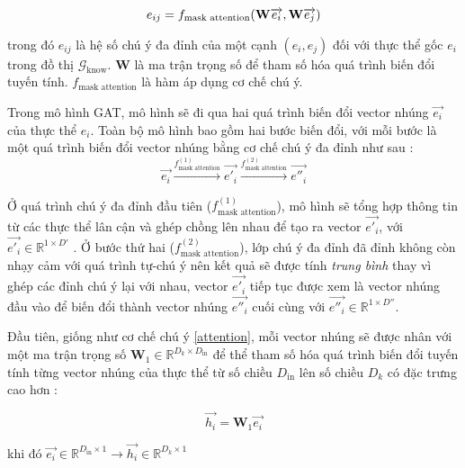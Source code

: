 \begin{equation}
	\label{maskAttention}
	\centering
	{e_{ij}}={f_{\text{mask attention}}(\mathbf{W} \overrightarrow{e_i}, \mathbf{W} \overrightarrow{e_j})}
\end{equation}

trong đó $e_{ij}$ là hệ số chú ý đa đỉnh của một cạnh $(e_i, e_j)$ đối với thực thể gốc $e_i$ trong đồ thị $\mathcal{G}_{\text{know}}$. $\mathbf{W}$ là ma trận trọng số để tham số hóa quá trình biến đổi tuyến tính. $f_{\text{mask attention}}$ là hàm áp dụng cơ chế chú ý.

Trong mô hình GAT, mô hình sẽ đi qua hai quá trình biến đổi vector nhúng $\overrightarrow{e_i}$ của thực thể $e_i$. Toàn bộ mô hình bao gồm hai bước biến đổi, với mỗi bước là một quá trình biến đổi vector nhúng bằng cơ chế chú ý đa đỉnh như sau :
\begin{equation}
	\label{gatProcess}
	\overrightarrow{e_i} \xrightarrow{f_{\text{mask attention}}^{(1)}} \overrightarrow{e'_i} \xrightarrow{f_{\text{mask attention}}^{(2)}} \overrightarrow{e''_i}
\end{equation}

Ở quá trình chú ý đa đỉnh đầu tiên ($f_{\text{mask attention}}^{(1)}$), mô hình sẽ tổng hợp thông tin từ các thực thể lân cận và ghép chồng lên nhau để tạo ra vector $\overrightarrow{e'_i}$, với $\overrightarrow{e'_i} \in \mathbb{R}^{1 \times D'}$ . Ở bước thứ hai ($f_{\text{mask attention}}^{(2)}$), lớp chú ý đa đỉnh đã đỉnh không còn nhạy cảm với quá trình tự-chú ý nên kết quả sẽ được tính \textit{trung bình} thay vì ghép các đỉnh chú ý lại với nhau, vector $\overrightarrow{e'_i}$ tiếp tục được xem là vector nhúng đầu vào để biến đổi thành vector nhúng $\overrightarrow{e''_i}$ cuối cùng với $\overrightarrow{e''_i} \in \mathbb{R}^{1 \times D''}$.

Đầu tiên, giống như cơ chế chú ý \ref{attention}, mỗi vector nhúng sẽ được nhân với một ma trận trọng số $\mathbf{W}_1 \in \mathbb{R}^{D_k \times D_{\text{in}}}$ để thể tham số hóa quá trình biến đổi tuyến tính từng vector nhúng của thực thể từ số chiều $D_{\text{in}}$ lên số chiều $D_k$ có đặc trưng cao hơn :

\begin{equation}
	\overrightarrow{h_i} = \mathbf{W}_{1} \overrightarrow{e_i}
\end{equation}

khi đó $\overrightarrow{e_i} \in \mathbb{R}^{D_{\text{in}} \times 1}
\xrightarrow{} \overrightarrow{h_i} \in \mathbb{R}^{D_k \times 1}$

